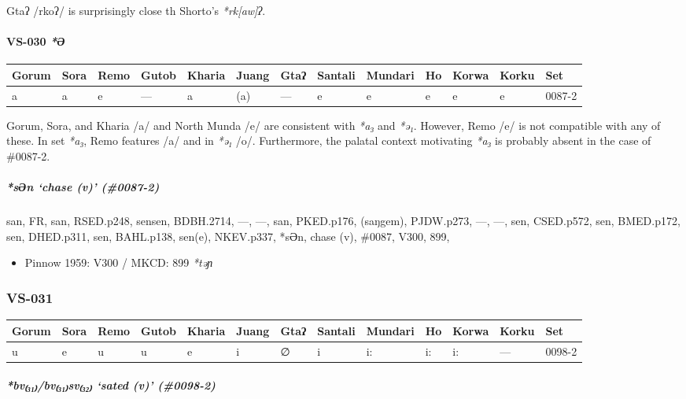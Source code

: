 \documentclass[a4paper,]{article}
\providecommand{\tightlist}{%
  \setlength{\itemsep}{0pt}\setlength{\parskip}{0pt}}
\let\oldparagraph\paragraph
\renewcommand{\paragraph}[1]{\oldparagraph{#1}\mbox{}}
\let\oldsubparagraph\subparagraph
\renewcommand{\subparagraph}[1]{\oldsubparagraph{#1}\mbox{}}
\begin{document}
Gtaʔ /rkoʔ/ is surprisingly close th Shorto's \emph{*rk{[}aw{]}ʔ}.

\paragraph{\texorpdfstring{VS-030
\emph{*Ə}}{VS-030 *Ə}}\label{vs-030-ux259}

\begin{longtable}[]{@{}lllllllllllll@{}}
\toprule
Gorum & Sora & Remo & Gutob & Kharia & Juang & Gtaʔ & Santali & Mundari
& Ho & Korwa & Korku & Set\tabularnewline
\midrule
\endhead
a & a & e & --- & a & (a) & --- & e & e & e & e & e &
0087-2\tabularnewline
\bottomrule
\end{longtable}

Gorum, Sora, and Kharia /a/ and North Munda /e/ are consistent with
\emph{*a₃} and \emph{*ə₁}. However, Remo /e/ is not compatible with any
of these. In set \emph{*a₃}, Remo features /a/ and in \emph{*ə₁} /o/.
Furthermore, the palatal context motivating \emph{*a₃} is probably
absent in the case of \#0087-2.

\subparagraph{\texorpdfstring{\emph{*sƏn} `chase (v)'
(\#0087-2)}{*sƏn chase (v) (\#0087-2)}}\label{sux259n-chase-v-0087-2}

san, FR, san, RSED.p248, sensen, BDBH.2714, ---, ---, san, PKED.p176,
(saŋgem), PJDW.p273, ---, ---, sen, CSED.p572, sen, BMED.p172, sen,
DHED.p311, sen, BAHL.p138, sen(e), NKEV.p337, *sƏn, chase (v), \#0087,
V300, 899,

\begin{itemize}
\tightlist
\item
  Pinnow 1959: V300 / MKCD: 899 \emph{*təɲ}
\end{itemize}

\subsubsection{VS-031}\label{vs-031}

\begin{longtable}[]{@{}lllllllllllll@{}}
\toprule
Gorum & Sora & Remo & Gutob & Kharia & Juang & Gtaʔ & Santali & Mundari
& Ho & Korwa & Korku & Set\tabularnewline
\midrule
\endhead
u & e & u & u & e & i & ∅ & i & i: & i: & i: & --- &
0098-2\tabularnewline
\bottomrule
\end{longtable}

\subparagraph{\texorpdfstring{\emph{*bv₍₃₁₎/bv₍₃₁₎sv₍₃₂₎} `sated (v)'
(\#0098-2)}{*bv₍₃₁₎/bv₍₃₁₎sv₍₃₂₎ sated (v) (\#0098-2)}}\label{bvbvsv-sated-v-0098-2}
\end{document}

